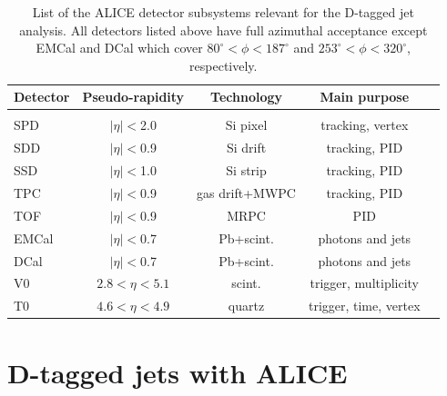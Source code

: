 \documentclass[12pt, a4paper, twoside, titlepage]{article}
\begin{document}
\begin{table}
\centering
\begin{tabular}[bt]{lcccc}
Detector		& Pseudo-rapidity		& Technology			& Main purpose			\\
\hline \\
SPD			& $\lvert \eta\rvert <$2.0	& Si pixel				& tracking, vertex		\\
SDD			& $\lvert \eta\rvert <$0.9 	& Si drift				& tracking, PID			\\
SSD			& $\lvert \eta\rvert <$1.0 	& Si strip				& tracking, PID			\\
TPC 			& $\lvert \eta\rvert <$0.9 	& gas drift+MWPC		& tracking, PID			\\
TOF			& $\lvert \eta\rvert <$0.9	& MRPC				& PID				\\
EMCal		& $\lvert \eta\rvert <$0.7 	& Pb+scint. 			& photons and jets		\\
DCal			& $\lvert \eta\rvert <$0.7 	& Pb+scint. 			& photons and jets		\\
V0			& $2.8 <\eta< 5.1$		& scint.				& trigger, multiplicity		\\
T0			& $4.6 <\eta< 4.9$		& quartz				& trigger, time, vertex	\\
\end{tabular}
\caption{List of the ALICE detector subsystems relevant for the D-tagged jet analysis. All detectors listed above have full azimuthal acceptance except EMCal and DCal 
which cover $80^{\circ} <\phi< 187^{\circ}$ and $253^{\circ} <\phi< 320^{\circ}$, respectively.
\label{tab:ALICEdetectors}}
\end{table}

\section{D-tagged jets with ALICE}
\end{document}

